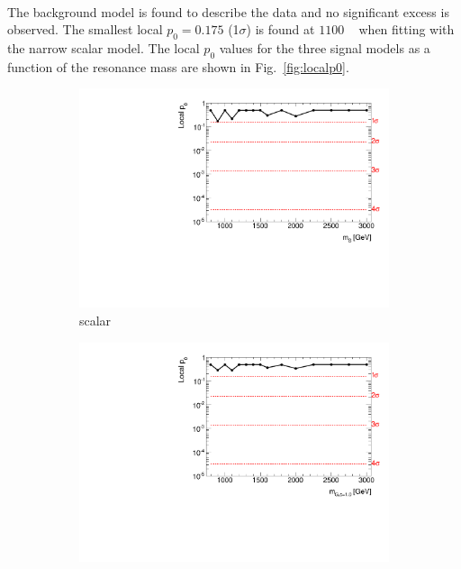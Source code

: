 \paragraph{}
The background model is found to describe the data and no significant excess is observed. 
The smallest local $p_0=0.175$ (1$\sigma$) is found at $1100$ \GeV~ when fitting with the narrow scalar model. The local $p_0$ values for the three signal models as a function of the resonance mass are shown in Fig.~\ref{fig:localp0}.

\begin{figure}[htb!]
\centering
\captionsetup{justification=centering}
    \hspace{-2.5cm}
    \begin{subfigure}[b]{0.35\textwidth}
        \includegraphics[width=\textwidth,angle=-90]{figures/boosted/results/p0_s_allmasses_boosted.pdf}
        \caption{scalar}
        \label{fig:localp0-s}
    \end{subfigure}
    \quad \quad \quad \quad \quad
    \begin{subfigure}[b]{0.35\textwidth}
        \includegraphics[width=\textwidth,angle=-90]{figures/boosted/results/p0_g10_allmasses_boosted.pdf}

\end{subfigure}
\end{figure}
